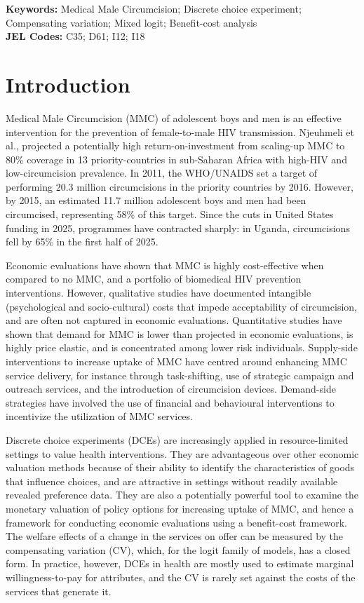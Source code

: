 \documentclass[11pt]{article}
\numberwithin{equation}{section}\numberwithin{figure}{section}\numberwithin{table}{section}
\begin{document}
{\small\textbf{Keywords:} Medical Male Circumcision; Discrete choice experiment; Compensating variation; Mixed logit; Benefit-cost analysis \\
\textbf{JEL Codes:} C35; D61; I12; I18}


\section{Introduction}
Medical Male Circumcision (MMC) of adolescent boys and men is an effective intervention for the prevention of female-to-male HIV transmission.\cite{RN16} Njeuhmeli et al.,\cite{RN25} projected a potentially high return-on-investment from scaling-up MMC to 80\% coverage in 13 priority-countries in sub-Saharan Africa with high-HIV and low-circumcision prevalence. In 2011, the WHO/UNAIDS set a target of performing 20.3 million circumcisions in the priority countries by 2016. However, by 2015, an estimated 11.7 million adolescent boys and men had been circumcised, representing 58\% of this target.\cite{RN94} Since the cuts in United States funding in 2025, programmes have contracted sharply: in Uganda, circumcisions fell by 65\% in the first half of 2025.\cite{UNAIDS2025,Devex2025}

Economic evaluations have shown that MMC is highly cost-effective when compared to no MMC,\cite{RN17,RN18,RN19,RN20,RN21} and a portfolio of biomedical HIV prevention interventions.\cite{RN23} However, qualitative studies have documented intangible (psychological and socio-cultural) costs that impede acceptability of circumcision,\cite{RN173} and are often not captured in economic evaluations. Quantitative studies have shown that demand for MMC is lower than projected in economic evaluations, is highly price elastic,\cite{RN29,RN33} and is concentrated among lower risk individuals.\cite{RN6} Supply-side interventions to increase uptake of MMC have centred around enhancing MMC service delivery, for instance through task-shifting, use of strategic campaign and outreach services, and the introduction of circumcision devices.\cite{RN255} Demand-side strategies have involved the use of financial and behavioural interventions to incentivize the utilization of MMC services.\cite{RN96}

Discrete choice experiments (DCEs) are increasingly applied in resource-limited settings to value health interventions.\cite{RN287,RN75} They are advantageous over other economic valuation methods because of their ability to identify the characteristics of goods that influence choices,\cite{RN76} and are attractive in settings without readily available revealed preference data. They are also a potentially powerful tool to examine the monetary valuation of policy options for increasing uptake of MMC, and hence a framework for conducting economic evaluations using a benefit-cost framework. The welfare effects of a change in the services on offer can be measured by the compensating variation (CV), which, for the logit family of models, has a closed form.\cite{RN93,RN249} In practice, however, DCEs in health are mostly used to estimate marginal willingness-to-pay for attributes, and the CV is rarely set against the costs of the services that generate it.
\end{document}
